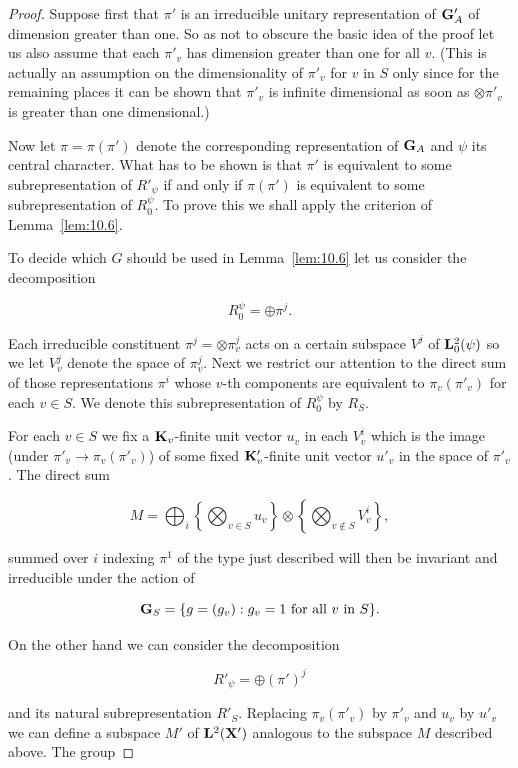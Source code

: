 \begin{proof}

Suppose first that $\pi'$ is an irreducible unitary representation of $\mathbf{G}'_A$ of dimension greater than one. So as not to obscure the basic idea of the proof let us also assume that each $\pi'_v$ has dimension greater than one for all $v$. (This is actually an assumption on the dimensionality of $\pi'_v$ for $v$ in $S$ only since for the remaining places it can be shown that $\pi'_v$ is infinite dimensional as soon as $\otimes \pi'_v$ is greater than one dimensional.)

Now let $\pi = \pi(\pi')$ denote the corresponding representation of $\mathbf{G}_A$ and $\psi$ its central character. What has to be shown is that $\pi'$ is equivalent to some subrepresentation of $R'_\psi$ if and only if $\pi(\pi')$ is equivalent to some subrepresentation of $R^{\psi}_0$. To prove this we shall apply the criterion of Lemma~\ref{lem:10.6}.

To decide which $G$ should be used in Lemma~\ref{lem:10.6} let us consider the decomposition

\[
R^{\psi}_0 = \oplus \pi^j.
\]

Each irreducible constituent $\pi^j = \otimes \pi^j_v$ acts on a certain subspace $V^j$ of $\mathbf{L}_0^2(\psi)$ so we let $V^j_v$ denote the space of $\pi^j_v$. Next we restrict our attention to the direct sum of those representations $\pi^i$ whose $v$-th components are equivalent to $\pi_v(\pi'_v)$ for each $v \in S$. We denote this subrepresentation of $R^{\psi}_0$ by $R_S$.

For each $v \in S$ we fix a $\mathbf{K}_v$-finite unit vector $u_v$ in each $V^i_v$ which is the image (under $\pi'_v \to \pi_v(\pi'_v)$) of some fixed $\mathbf{K}'_v$-finite unit vector $u'_v$ in the space of $\pi'_v$. The direct sum

\[
M = \bigoplus_i \left\{\bigotimes_{v \in S} u_v\right\} \otimes \left\{\bigotimes_{v \notin S} V^i_v\right\},
\]

summed over $i$ indexing $\pi^1$ of the type just described will then be invariant and irreducible under the action of

\[
\mathbf{G}_S = \{g = (g_v): g_v = 1 \ \text{for all } v \text{ in } S\}.
\]

On the other hand we can consider the decomposition

\[
R'_\psi = \oplus (\pi')^j
\]

and its natural subrepresentation $R'_S$. Replacing $\pi_v(\pi'_v)$ by $\pi'_v$ and $u_v$ by $u'_v$ we can define a subspace $M'$ of $\mathbf{L}^2(\mathbf{X}')$ analogous to the subspace $M$ described above. The group


\end{proof}
